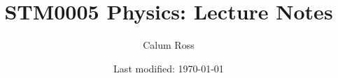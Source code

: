 \documentclass[a4paper,12pt]{book}
\begin{document}
\title{STM0005 Physics: Lecture Notes}
\author{Calum Ross}
\date{Last modified: \today}
\maketitle %
\tableofcontents %

\mainmatter


\newpage



\newpage



\newpage




\newpage




\newpage





\newpage



\newpage



\newpage



\newpage

\end{document}
